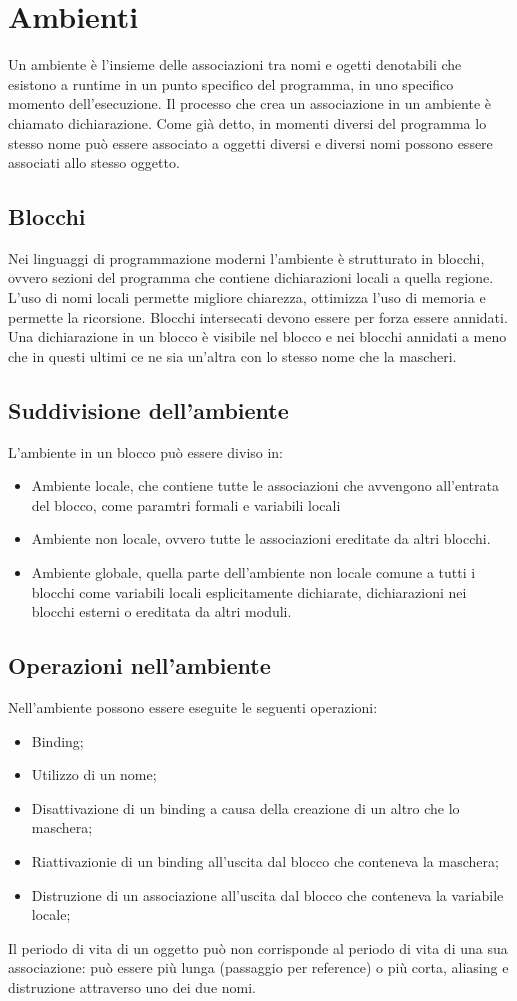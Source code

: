 \section{Ambienti}
Un ambiente \`e l'insieme delle associazioni tra nomi e ogetti denotabili che esistono a runtime in un punto specifico del programma, in uno specifico momento dell'esecuzione. 
Il processo che crea un associazione in un ambiente \`e chiamato dichiarazione. Come gi\`a detto, in momenti diversi del programma lo stesso nome pu\`o essere associato a 
oggetti diversi e diversi nomi possono essere associati allo stesso oggetto. 
\subsection{Blocchi}
Nei linguaggi di programmazione moderni l'ambiente \`e strutturato in blocchi, ovvero sezioni del programma che contiene dichiarazioni locali a quella regione. L'uso di nomi 
locali permette migliore chiarezza, ottimizza l'uso di memoria e permette la ricorsione. Blocchi intersecati devono essere per forza essere annidati. Una dichiarazione in un 
blocco \`e visibile nel blocco e nei blocchi annidati a meno che in questi ultimi ce ne sia un'altra con lo stesso nome che la mascheri. 
\subsection{Suddivisione dell'ambiente}
L'ambiente in un blocco pu\`o essere diviso in: 
\begin{itemize}
\item Ambiente locale, che contiene tutte le associazioni che avvengono all'entrata del blocco, come paramtri formali e variabili locali 
\item Ambiente non locale, ovvero tutte le associazioni ereditate da altri blocchi.
\item Ambiente globale, quella parte dell'ambiente non locale comune a tutti i blocchi come variabili locali esplicitamente dichiarate, dichiarazioni nei blocchi esterni o 
ereditata da altri moduli.
\end{itemize}
\subsection{Operazioni nell'ambiente}
Nell'ambiente possono essere eseguite le seguenti operazioni:
\begin{itemize}
\item Binding;
\item Utilizzo di un nome;
\item Disattivazione di un binding a causa della creazione di un altro che lo maschera;
\item Riattivazionie di un binding all'uscita dal blocco che conteneva la maschera;
\item Distruzione di un associazione all'uscita dal blocco che conteneva la variabile locale;
\end{itemize}
Il periodo di vita di un oggetto pu\`o non corrisponde al periodo di vita di una sua associazione: pu\`o essere pi\`u lunga (passaggio per reference) o pi\`u corta, aliasing
e distruzione attraverso uno dei due nomi. 
